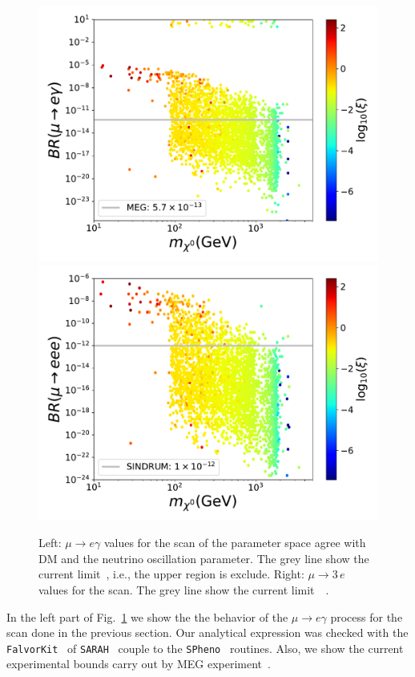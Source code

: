 \documentclass[12pt,letterpaper]{article}
\begin{document}
\begin{figure}
\begin{center}
\includegraphics[scale=0.43]{ueg_with_neutrino_physics}
\includegraphics[scale=0.43]{u3e_with_neutrino_physics}
\caption{Left: $\mu\rightarrow e\gamma$ values for the scan of the parameter space agree with DM and the neutrino oscillation parameter. The grey line show the current limit~\cite{Adam:2013mnn}, i.e., the upper region is exclude.
Right: $\mu\rightarrow 3\,e$ values for the scan. The grey line show the current limit~~\cite{Bertl:1985mw}.}
\label{fig:ueg-e3e}
\end{center}
\end{figure}
%
In the left part of Fig.~\ref{fig:ueg-e3e} we show the the behavior of the $\mu\rightarrow e\gamma$ process for the scan done in the previous section. Our analytical expression was checked with the \texttt{FalvorKit}~\cite{Porod:2014xia} of \texttt{SARAH}~\cite{Staub:2008uz,Staub:2009bi,Staub:2010jh,Staub:2012pb,Staub:2013tta} couple to the \texttt{SPheno}~\cite{Porod:2003um,Porod:2011nf} routines. Also, we show the current experimental bounds carry out by MEG experiment~\cite{Adam:2013mnn}. 
\end{document}
